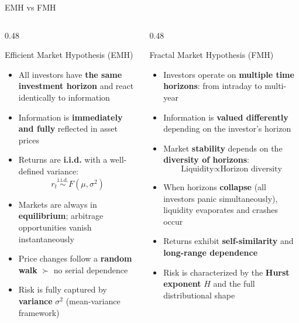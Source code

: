 \documentclass[9pt, aspectratio=169, t]{beamer}
\theoremstyle{definition}
\begin{document}
\begin{frame}{EMH vs FMH}
    \begin{columns}[T]
        \begin{column}{0.48\textwidth}
            \begin{block}{Efficient Market Hypothesis (EMH)}
                \begin{itemize}
                    \item All investors have \textbf{the same investment horizon} and react identically to information
                    \item Information is \textbf{immediately and fully} reflected in asset prices
                    \item Returns are \textbf{i.i.d.} with a well-defined variance:
                    \[
                        r_t \overset{\text{i.i.d.}}{\sim} F(\mu, \sigma^2)
                    \]
                    \item Markets are always in \textbf{equilibrium}; arbitrage opportunities vanish instantaneously
                    \item Price changes follow a \textbf{random walk} $\succ$ no serial dependence
                    \item Risk is fully captured by \textbf{variance} $\sigma^2$ (mean-variance framework)
                \end{itemize}
            \end{block}
        \end{column}
        \begin{column}{0.48\textwidth}
            \begin{block}{Fractal Market Hypothesis (FMH)}
                \begin{itemize}
                    \item Investors operate on \textbf{multiple time horizons}: from intraday to multi-year
                    \item Information is \textbf{valued differently} depending on the investor's horizon
                    \item Market \textbf{stability} depends on the \textbf{diversity of horizons}:
                    \[
                        \text{Liquidity} \propto \text{Horizon diversity}
                    \]
                    \item When horizons \textbf{collapse} (all investors panic simultaneously), liquidity evaporates and crashes occur
                    \item Returns exhibit \textbf{self-similarity} and \textbf{long-range dependence}
                    \item Risk is characterized by the \textbf{Hurst exponent} $H$ and the full distributional shape
                \end{itemize}
            \end{block}
        \end{column}
    \end{columns}
\end{frame}
\end{document}
